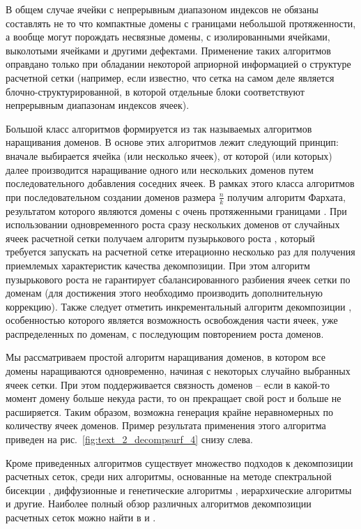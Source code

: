 В общем случае ячейки с непрерывным диапазоном индексов не обязаны составлять не то что компактные домены с границами небольшой протяженности, а вообще могут порождать несвязные домены, с изолированными ячейками, выколотыми ячейками и другими дефектами.
Применение таких алгоритмов оправдано только при обладании некоторой априорной информацией о структуре расчетной сетки (например, если известно, что сетка на самом деле является блочно-структурированной, в которой отдельные блоки соответствуют непрерывным диапазонам индексов ячеек).

Большой класс алгоритмов формируется из так называемых алгоритмов наращивания доменов.
В основе этих алгоритмов лежит следующий принцип: вначале выбирается ячейка (или несколько ячеек), от которой (или которых) далее производится наращивание одного или нескольких доменов путем последовательного добавления соседних ячеек.
В рамках этого класса алгоритмов при последовательном создании доменов размера $\frac{n}{k}$ получим алгоритм Фархата, результатом которого являются домены с очень протяженными границами \cite{Farhat1988Decomp}.
При использовании одновременного роста сразу нескольких доменов от случайных ячеек расчетной сетки получаем алгоритм пузырькового роста \cite{Preis1997Decomp}, который требуется запускать на расчетной сетке итерационно несколько раз для получения приемлемых характеристик качества декомпозиции.
При этом алгоритм пузырькового роста не гарантирует сбалансированного разбиения ячеек сетки по доменам (для достижения этого необходимо производить дополнительную коррекцию).
Также следует отметить инкрементальный алгоритм декомпозиции \cite{Yakobovsky2005Decomp}, особенностью которого является возможность освобождения части ячеек, уже распределенных по доменам, с последующим повторением роста доменов.

Мы рассматриваем простой алгоритм наращивания доменов, в котором все домены наращиваются одновременно, начиная с некоторых случайно выбранных ячеек сетки.
При этом поддерживается связность доменов -- если в какой-то момент домену больше некуда расти, то он прекращает свой рост и больше не расширяется.
Таким образом, возможна генерация крайне неравномерных по количеству ячеек доменов.
Пример результата применения этого алгоритма приведен на рис.~\ref{fig:text_2_decompsurf_4} снизу слева.

Кроме приведенных алгоритмов существует множество подходов к декомпозиции расчетных сеток, среди них алгоритмы, основанные на методе спектральной бисекции \cite{Urschel2014Decomp}, диффузионные и генетические алгоритмы \cite{Zhao2019Decomp}, иерархические алгоритмы \cite{Kapyris1998Decomp} и другие.
Наиболее полный обзор различных алгоритмов декомпозиции расчетных сеток можно найти в \cite{Golovchenko2020Decomp} и \cite{Zheleznyakova2017Decomp}.

